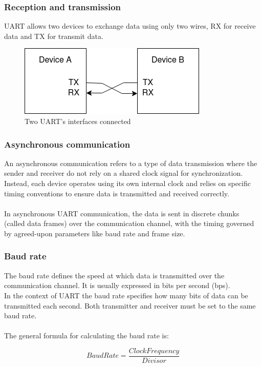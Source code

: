\documentclass[12pt]{article}
\begin{document}
\subsubsection{Reception and transmission}
UART allows two devices to exchange data using only two wires, RX for receive data
and TX for transmit data.\\
\begin{figure}[h]
  \centering
  \includegraphics[scale=0.6]{UART_interface.drawio.png}
  \caption{Two UART's interfaces connected}
\end{figure}


\subsubsection{Asynchronous communication}
An asynchronous communication refers to a type of data transmission where the sender
and receiver do not rely on a shared clock signal for synchronization. Instead, each
device operates using its own internal clock and relies on specific timing 
conventions to ensure data is transmitted and received correctly. \\~\\
In asynchronous UART communication, the data is sent in discrete chunks 
(called data frames) over the communication channel, with the timing governed by 
agreed-upon parameters like baud rate and frame size.

\subsubsection{Baud rate}
The baud rate defines the speed at which data is transmitted over the communication
channel. It is usually expressed in bits per second (bps). \\
In the context of UART the baud rate specifies how many bits of data can be 
transmitted each second. Both transmitter and receiver must be set to the same baud
rate. \\~\\
The general formula for calculating the baud rate is:

\[Baud Rate = \frac{Clock Frequency}{Divisor}\]
\end{document}
